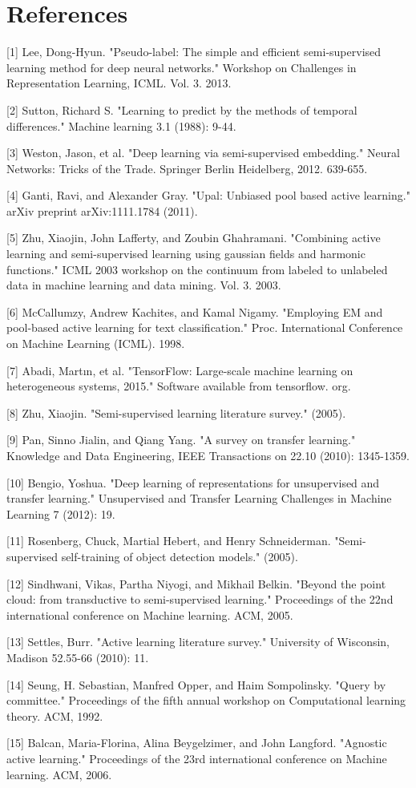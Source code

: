 \documentclass{article}
\begin{document}
\section*{References}

\small

[1] Lee, Dong-Hyun. "Pseudo-label: The simple and efficient semi-supervised learning method for deep neural networks." Workshop on Challenges in Representation Learning, ICML. Vol. 3. 2013.

[2] Sutton, Richard S. "Learning to predict by the methods of temporal differences." Machine learning 3.1 (1988): 9-44.

[3] Weston, Jason, et al. "Deep learning via semi-supervised embedding." Neural Networks: Tricks of the Trade. Springer Berlin Heidelberg, 2012. 639-655.

[4] Ganti, Ravi, and Alexander Gray. "Upal: Unbiased pool based active learning." arXiv preprint arXiv:1111.1784 (2011).

[5] Zhu, Xiaojin, John Lafferty, and Zoubin Ghahramani. "Combining active learning and semi-supervised learning using gaussian fields and harmonic functions." ICML 2003 workshop on the continuum from labeled to unlabeled data in machine learning and data mining. Vol. 3. 2003.

[6] McCallumzy, Andrew Kachites, and Kamal Nigamy. "Employing EM and pool-based active learning for text classification." Proc. International Conference on Machine Learning (ICML). 1998.

[7] Abadi, Martın, et al. "TensorFlow: Large-scale machine learning on heterogeneous systems, 2015." Software available from tensorflow. org.

[8] Zhu, Xiaojin. "Semi-supervised learning literature survey." (2005).

[9] Pan, Sinno Jialin, and Qiang Yang. "A survey on transfer learning." Knowledge and Data Engineering, IEEE Transactions on 22.10 (2010): 1345-1359.

[10] Bengio, Yoshua. "Deep learning of representations for unsupervised and transfer learning." Unsupervised and Transfer Learning Challenges in Machine Learning 7 (2012): 19.

[11] Rosenberg, Chuck, Martial Hebert, and Henry Schneiderman. "Semi-supervised self-training of object detection models." (2005).

[12] Sindhwani, Vikas, Partha Niyogi, and Mikhail Belkin. "Beyond the point cloud: from transductive to semi-supervised learning." Proceedings of the 22nd international conference on Machine learning. ACM, 2005.

[13] Settles, Burr. "Active learning literature survey." University of Wisconsin, Madison 52.55-66 (2010): 11.

[14] Seung, H. Sebastian, Manfred Opper, and Haim Sompolinsky. "Query by committee." Proceedings of the fifth annual workshop on Computational learning theory. ACM, 1992.

[15] Balcan, Maria-Florina, Alina Beygelzimer, and John Langford. "Agnostic active learning." Proceedings of the 23rd international conference on Machine learning. ACM, 2006.
\end{document}
